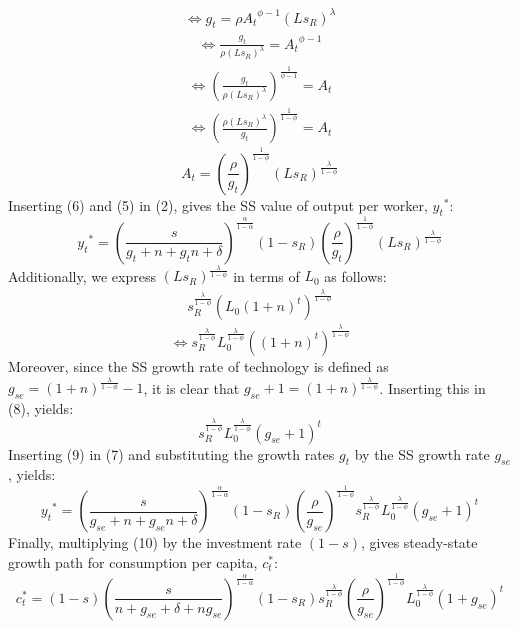 \documentclass[11pt]{article} %
\begin{document}
\begin{align*}
    \Longleftrightarrow g_t = {\rho}{A_t}^{\phi-1}(Ls_R)^{\lambda}
\end{align*}
\begin{align*}
    \Longleftrightarrow \frac{g_t}{\rho(Ls_R)^{\lambda}} = {A_t}^{\phi-1}
\end{align*}
\begin{align*}
    \Longleftrightarrow \left(\frac{g_t}{\rho(Ls_R)^{\lambda}}\right)^{\frac{1}{\phi-1}} = {A_t}
\end{align*}
\begin{align*}
    \Longleftrightarrow\left(\frac{\rho(Ls_R)^{\lambda}}{g_t}\right)^{\frac{1}{1-\phi}} = {A_t}
\end{align*}
\begin{equation}
    A_t=\left(\frac{\rho}{g_t}\right)^{\frac{1}{1-\phi}}(Ls_R)^{\frac{\lambda}{1-\phi}}
\end{equation}
Inserting (6) and (5) in (2), gives the SS value of output per worker, ${y_t}^*$:
\begin{equation}
    {y_t}^* = \left(\frac{s}{g_t+n+g_tn+\delta}\right)^{\frac{\alpha}{1-\alpha}}(1-s_R) \left(\frac{\rho}{g_t}\right)^{\frac{1}{1-\phi}}(Ls_R)^{\frac{\lambda}{1-\phi}}
\end{equation}
Additionally, we express $(Ls_R)^{\frac{\lambda}{1-\phi}}$ in terms of $L_0$ as follows:
\begin{align*}
    s_R^{\frac{\lambda}{1-\phi}}\left(L_0(1+n)^{t}\right)^{\frac{\lambda}{1-\phi}}
\end{align*}
\begin{equation}
    \Longleftrightarrow s_R^{\frac{\lambda}{1-\phi}}L_0^{\frac{\lambda}{1-\phi}}\left((1+n)^{t}\right)^{\frac{\lambda}{1-\phi}}
\end{equation}
Moreover, since the SS growth rate of technology is defined as $g_{se}=(1+n)^{\frac{\lambda}{1-\phi}}-1$, it is clear that $g_{se}+1=(1+n)^{\frac{\lambda}{1-\phi}}$. Inserting this in (8), yields:
\begin{equation}
    s_R^{\frac{\lambda}{1-\phi}}L_0^{\frac{\lambda}{1-\phi}}(g_{se}+1)^t
\end{equation}
Inserting (9) in (7) and substituting the growth rates $g_t$ by the SS growth rate $g_{se}$, yields:
\begin{equation}
    {y_t}^* = \left(\frac{s}{g_{se}+n+g_{se}n+\delta}\right)^{\frac{\alpha}{1-\alpha}}(1-s_R) \left(\frac{\rho}{g_{se}}\right)^{\frac{1}{1-\phi}}s_R^{\frac{\lambda}{1-\phi}}L_0^{\frac{\lambda}{1-\phi}}(g_{se}+1)^t
\end{equation}
Finally, multiplying (10) by the investment rate $(1-s)$, gives steady-state growth path for consumption per capita, $c_t^*$:
\begin{equation}
    c_t^* = (1-s)\left(\frac{s}{n+g_{se}+\delta+ng_{se}}\right)^{\frac{\alpha}{1-\alpha}}(1-s_{R})s_R^{\frac{\lambda}{1-\phi}}\left(\frac{\rho}{g_{se}} \right)^{\frac{1}{1-\phi}}L_0^{\frac{\lambda}{1-\phi}}(1+g_{se})^t
\end{equation}
\end{document}
